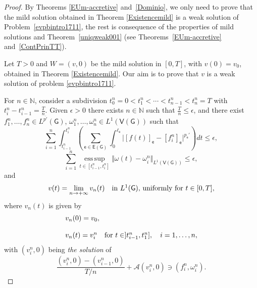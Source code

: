 \documentclass[reqno,12pt]{amsart}
\def\N{\mathbb N} %
\def\e{\mathsf{e}} 	%
\newcommand{\G}{\mathsf{G}}	%
\newcommand{\V}{\mathsf{V}}	%
\newcommand{\E}{\mathsf{E}}	%
\numberwithin{equation}{section} %
\begin{document}
\begin{proof} 
  By Theorems \ref{EUm-accretive} and~\ref{Dominio}, we only need to prove that the mild solution obtained in Theorem \ref{Existencemild}  is a weak solution  of Problem~\eqref{evpbintro1711},  the rest is consequence of the properties of   mild solutions and Theorem~\ref{uniqweak001} (see Theorems~\ref{EUm-accretive} and~\ref{ContPrinTT}).


 Let $T >0$ and $W = (v,0)$ be the mild solution in $[0,T]$, with $v(0) = v_0$, obtained in  Theorem \ref{Existencemild}. Our aim is to prove that $v$ is a weak solution  of problem \eqref{evpbintro1711}. 
 
   For $n \in \N$,  consider a subdivision $t_0^n = 0 < t_1^n < \cdots < t_{n-1}^n < t_n^n = T$ with $t_i^n - t_{i-1}^n = \frac{T}{n}$. Given $\epsilon >0$ there exists $n\in \mathbb{N}$ such that $\frac{T}{n}\le\epsilon$, and there exist $f_1^n, \ldots,f_n^n \in L^{\overline{p'}}(\G)$, $\omega_1^n, \ldots, \omega_n^n \in L^{1}(\V(\G))$  such that
\begin{equation}\label{dataprox001}
\sum_{i=1}^n \int_{t_{i-1}^n}^{t_i^n} \left( \sum_{\e \in\E(\G)}\int_{0}^{\ell_\e} \vert [f(t)]_\e - [f_i^n]_\e \vert^{p_\e'}  \right)dt\leq \epsilon,   
\end{equation}
\begin{equation}\label{dataprox001foromega}
\sum_{i=1}^n \operatorname*{ess\,sup}_{t\in[t_{i-1}^n,t_i^n]} \Vert \omega(t) - \omega_i^n \Vert_{L^{1}(\V(\G))} \leq \epsilon,
\end{equation}
and
\begin{equation}\label{maildWeak1}
v(t) = \lim_{n \to +\infty} v_n(t) \quad \hbox{in $L^1(\G)$, uniformly for }  t \in [0,T],
\end{equation}
where  $v_n(t)$ is given  by
\begin{equation}\label{maildWeak2}
\begin{array}{l}
 v_n(0) = v_0, \\ \\
v_n(t) = v_i^n  \quad \hbox{for} \ t \in ]t_{i-1}^n, t_1^n], \quad i= 1, \ldots, n,
\end{array}
\end{equation}
with $(v_i^n,0)$ being {\it the solution} of
$$\frac{(v_i^n,0) - (v_{i-1}^n,0)}{T/n} + \mathcal{A}(v_i^n,0)\ni (f_i^n,\omega_i^n).$$
 

\end{proof}
\end{document}
